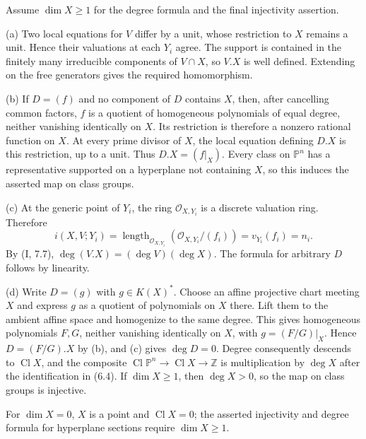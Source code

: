 Assume $\dim X\geq1$ for the degree formula and the final injectivity assertion.

(a) Two local equations for $V$ differ by a unit, whose restriction to $X$ remains a unit. Hence their valuations at each $Y_i$ agree. The support is contained in the finitely many irreducible components of $V\cap X$, so $V.X$ is well defined. Extending on the free generators gives the required homomorphism.

(b) If $D=(f)$ and no component of $D$ contains $X$, then, after cancelling common factors, $f$ is a quotient of homogeneous polynomials of equal degree, neither vanishing identically on $X$. Its restriction is therefore a nonzero rational function on $X$. At every prime divisor of $X$, the local equation defining $D.X$ is this restriction, up to a unit. Thus $D.X=(f|_X)$. Every class on $\mathbb P^n$ has a representative supported on a hyperplane not containing $X$, so this induces the asserted map on class groups.

(c) At the generic point of $Y_i$, the ring $\mathcal O_{X,Y_i}$ is a discrete valuation ring. Therefore
\[i(X,V;Y_i)=\operatorname{length}_{\mathcal O_{X,Y_i}}(\mathcal O_{X,Y_i}/(f_i))=v_{Y_i}(f_i)=n_i.\]
By (I, 7.7), $\deg(V.X)=(\deg V)(\deg X)$. The formula for arbitrary $D$ follows by linearity.

(d) Write $D=(g)$ with $g\in K(X)^*$. Choose an affine projective chart meeting $X$ and express $g$ as a quotient of polynomials on $X$ there. Lift them to the ambient affine space and homogenize to the same degree. This gives homogeneous polynomials $F,G$, neither vanishing identically on $X$, with $g=(F/G)|_X$. Hence $D=(F/G).X$ by (b), and (c) gives $\deg D=0$. Degree consequently descends to $\operatorname{Cl}X$, and the composite $\operatorname{Cl}\mathbb P^n\to\operatorname{Cl}X\to\mathbb Z$ is multiplication by $\deg X$ after the identification in (6.4). If $\dim X\geq1$, then $\deg X>0$, so the map on class groups is injective.

For $\dim X=0$, $X$ is a point and $\operatorname{Cl}X=0$; the asserted injectivity and degree formula for hyperplane sections require $\dim X\geq1$.

